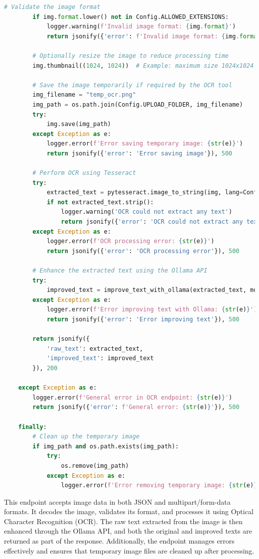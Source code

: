 \begin{lstlisting}[language=Python, caption={OCR Endpoint}]
        # Validate the image format
        if img.format.lower() not in Config.ALLOWED_EXTENSIONS:
            logger.warning(f'Invalid image format: {img.format}')
            return jsonify({'error': f'Invalid image format: {img.format}'}), 400

        # Optionally resize the image to reduce processing time
        img.thumbnail((1024, 1024))  # Example: maximum size 1024x1024

        # Save the image temporarily if required by the OCR tool
        img_filename = "temp_ocr.png"
        img_path = os.path.join(Config.UPLOAD_FOLDER, img_filename)
        try:
            img.save(img_path)
        except Exception as e:
            logger.error(f'Error saving temporary image: {str(e)}')
            return jsonify({'error': 'Error saving image'}), 500

        # Perform OCR using Tesseract
        try:
            extracted_text = pytesseract.image_to_string(img, lang=Config.TESSERACT_LANG)
            if not extracted_text.strip():
                logger.warning('OCR could not extract any text')
                return jsonify({'error': 'OCR could not extract any text'}), 400
        except Exception as e:
            logger.error(f'OCR processing error: {str(e)}')
            return jsonify({'error': 'OCR processing error'}), 500

        # Enhance the extracted text using the Ollama API
        try:
            improved_text = improve_text_with_ollama(extracted_text, model='llama3.2')
        except Exception as e:
            logger.error(f'Error improving text with Ollama: {str(e)}')
            return jsonify({'error': 'Error improving text'}), 500

        return jsonify({
            'raw_text': extracted_text,
            'improved_text': improved_text
        }), 200

    except Exception as e:
        logger.error(f'General error in OCR endpoint: {str(e)}')
        return jsonify({'error': f'General error: {str(e)}'}), 500

    finally:
        # Clean up the temporary image
        if img_path and os.path.exists(img_path):
            try:
                os.remove(img_path)
            except Exception as e:
                logger.error(f'Error removing temporary image: {str(e)}')
\end{lstlisting}

This endpoint accepts image data in both JSON and multipart/form-data formats. It decodes the image, validates its format, and processes it using Optical Character Recognition (OCR). The raw text extracted from the image is then enhanced through the Ollama API, and both the original and improved texts are returned as part of the response. Additionally, the endpoint manages errors effectively and ensures that temporary image files are cleaned up after processing.

